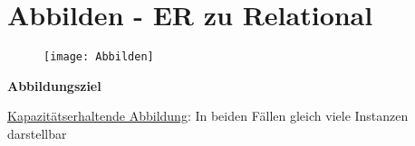 \section{Abbilden - ER zu Relational}
\label{sec:abbilden}

\begin{figure}[H]\centering\label{Abbilden}\texttt{[image: Abbilden]}\end{figure}

\textbf{Abbildungsziel}
\begin{items}
	\item \underline{Kapazitätserhaltende Abbildung}: In beiden Fällen gleich viele Instanzen darstellbar
\end{items}
